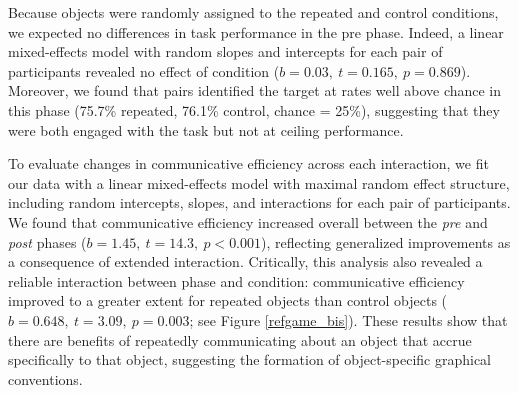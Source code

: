 \documentclass[10pt,letterpaper]{article}
\begin{document}
Because objects were randomly assigned to the repeated and control conditions, we expected no differences in task performance in the pre phase. Indeed, a linear mixed-effects model with random slopes and intercepts for each pair of participants revealed no effect of condition ($b = 0.03, ~t = 0.165, ~p = 0.869$). Moreover, we found that pairs identified the target at rates well above chance in this phase (75.7\% repeated, 76.1\% control, chance = 25\%), suggesting that they were both engaged with the task but not at ceiling performance.


To evaluate changes in communicative efficiency across each interaction, we fit our data with a linear mixed-effects model with maximal random effect structure, including random intercepts, slopes, and interactions for each pair of participants.
We found that communicative efficiency increased overall between the \textit{pre} and \textit{post} phases ($b = 1.45,~t = 14.3,~p <0.001$), reflecting generalized improvements as a consequence of extended interaction.
Critically, this analysis also revealed a reliable interaction between phase and condition: communicative efficiency improved to a greater extent for repeated objects than control objects ($b = 0.648, ~t = 3.09,~p = 0.003$; see Figure \ref{refgame_bis}).
These results show that there are benefits of repeatedly communicating about an object that accrue specifically to that object, suggesting the formation of object-specific graphical conventions.



\end{document}
